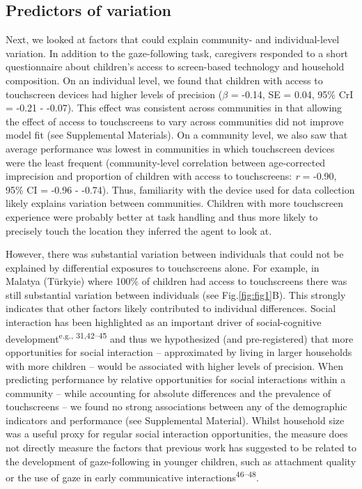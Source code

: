 \documentclass[
  man,floatsintext]{apa6}
\begin{document}
\hypertarget{predictors-of-variation}{%
\subsection{Predictors of variation}\label{predictors-of-variation}}

Next, we looked at factors that could explain community- and individual-level variation. In addition to the gaze-following task, caregivers responded to a short questionnaire about children's access to screen-based technology and household composition. On an individual level, we found that children with access to touchscreen devices had higher levels of precision (\(\beta\) = -0.14, SE = 0.04, 95\% CrI = -0.21 - -0.07). This effect was consistent across communities in that allowing the effect of access to touchscreens to vary across communities did not improve model fit (see Supplemental Materials). On a community level, we also saw that average performance was lowest in communities in which touchscreen devices were the least frequent (community-level correlation between age-corrected imprecision and proportion of children with access to touchscreens: \emph{r} = -0.90, 95\% CI = -0.96 - -0.74). Thus, familiarity with the device used for data collection likely explains variation between communities. Children with more touchscreen experience were probably better at task handling and thus more likely to precisely touch the location they inferred the agent to look at.

However, there was substantial variation between individuals that could not be explained by differential exposures to touchscreens alone. For example, in Malatya (Türkyie) where 100\% of children had access to touchscreens there was still substantial variation between individuals (see Fig.\ref{fig:fig1}B). This strongly indicates that other factors likely contributed to individual differences. Social interaction has been highlighted as an important driver of social-cognitive development\textsuperscript{e.g., 31,42--45} and thus we hypothesized (and pre-registered) that more opportunities for social interaction -- approximated by living in larger households with more children -- would be associated with higher levels of precision. When predicting performance by relative opportunities for social interactions within a community -- while accounting for absolute differences and the prevalence of touchscreens -- we found no strong associations between any of the demographic indicators and performance (see Supplemental Material). Whilst household size was a useful proxy for regular social interaction opportunities, the measure does not directly measure the factors that previous work has suggested to be related to the development of gaze-following in younger children, such as attachment quality or the use of gaze in early communicative interactions\textsuperscript{46--48}.
\end{document}
